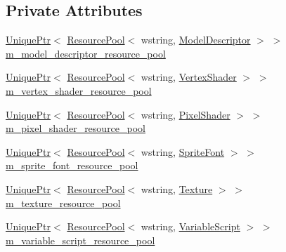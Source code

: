 \subsection*{Private Attributes}
\begin{DoxyCompactItemize}
\item 
\hyperlink{namespacemage_a3316d7143a973e37adf1110f2e80ca31}{Unique\+Ptr}$<$ \hyperlink{classmage_1_1_resource_pool}{Resource\+Pool}$<$ wstring, \hyperlink{classmage_1_1_model_descriptor}{Model\+Descriptor} $>$ $>$ \hyperlink{classmage_1_1_resource_manager_a26991ee1ef428871c8c7e1464613a36a}{m\+\_\+model\+\_\+descriptor\+\_\+resource\+\_\+pool}
\item 
\hyperlink{namespacemage_a3316d7143a973e37adf1110f2e80ca31}{Unique\+Ptr}$<$ \hyperlink{classmage_1_1_resource_pool}{Resource\+Pool}$<$ wstring, \hyperlink{classmage_1_1_vertex_shader}{Vertex\+Shader} $>$ $>$ \hyperlink{classmage_1_1_resource_manager_aee4af101fb42e8524121f18c16c76931}{m\+\_\+vertex\+\_\+shader\+\_\+resource\+\_\+pool}
\item 
\hyperlink{namespacemage_a3316d7143a973e37adf1110f2e80ca31}{Unique\+Ptr}$<$ \hyperlink{classmage_1_1_resource_pool}{Resource\+Pool}$<$ wstring, \hyperlink{classmage_1_1_pixel_shader}{Pixel\+Shader} $>$ $>$ \hyperlink{classmage_1_1_resource_manager_a139203cf050a3a8146f89b4b643d6092}{m\+\_\+pixel\+\_\+shader\+\_\+resource\+\_\+pool}
\item 
\hyperlink{namespacemage_a3316d7143a973e37adf1110f2e80ca31}{Unique\+Ptr}$<$ \hyperlink{classmage_1_1_resource_pool}{Resource\+Pool}$<$ wstring, \hyperlink{classmage_1_1_sprite_font}{Sprite\+Font} $>$ $>$ \hyperlink{classmage_1_1_resource_manager_a49369b160a75dee96cdebd2b957ae0c4}{m\+\_\+sprite\+\_\+font\+\_\+resource\+\_\+pool}
\item 
\hyperlink{namespacemage_a3316d7143a973e37adf1110f2e80ca31}{Unique\+Ptr}$<$ \hyperlink{classmage_1_1_resource_pool}{Resource\+Pool}$<$ wstring, \hyperlink{classmage_1_1_texture}{Texture} $>$ $>$ \hyperlink{classmage_1_1_resource_manager_aba76c2267b30ccae61c160497e8d8efc}{m\+\_\+texture\+\_\+resource\+\_\+pool}
\item 
\hyperlink{namespacemage_a3316d7143a973e37adf1110f2e80ca31}{Unique\+Ptr}$<$ \hyperlink{classmage_1_1_resource_pool}{Resource\+Pool}$<$ wstring, \hyperlink{classmage_1_1_variable_script}{Variable\+Script} $>$ $>$ \hyperlink{classmage_1_1_resource_manager_adc36ebb3e2d04fddc3a23e2f1303dbfe}{m\+\_\+variable\+\_\+script\+\_\+resource\+\_\+pool}
\end{DoxyCompactItemize}


